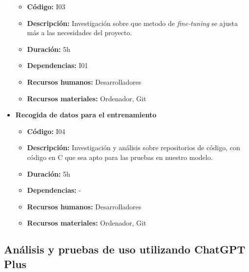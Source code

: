 \begin{itemize}
        \begin{itemize}
            \item \textbf{Código:} I03
            \item \textbf{Descripción:} Investigación sobre que metodo de \textit{fine-tuning} se ajusta más a las necesidades del proyecto.
            \item \textbf{Duración:} 5h
            \item \textbf{Dependencias:} I01
            \item \textbf{Recursos humanos:} Desarrolladores
            \item \textbf{Recursos materiales:} Ordenador, Git
        \end{itemize}
    \item \textbf{Recogida de datos para el entrenamiento}
        \begin{itemize}
            \item \textbf{Código:} I04
            \item \textbf{Descripción:} Investigación y análisis sobre repositorios de código, con código en C que sea apto para las pruebas en nuestro modelo. 
            \item \textbf{Duración:} 5h
            \item \textbf{Dependencias:} -
            \item \textbf{Recursos humanos:} Desarrolladores
            \item \textbf{Recursos materiales:} Ordenador, Git
        \end{itemize}
\end{itemize}

\subsection{Análisis y pruebas de uso utilizando ChatGPT Plus}
\label{subsec:tareas_ichatgpt}


